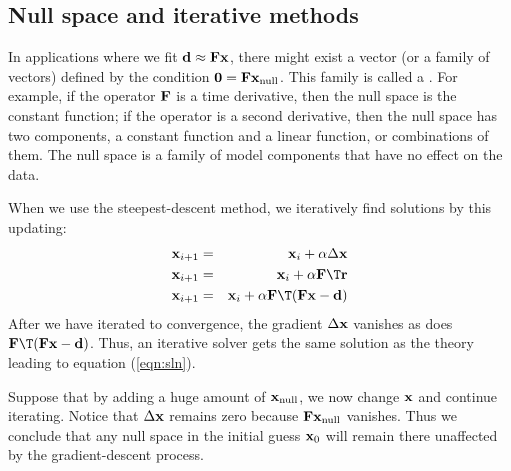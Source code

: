 \subsection{Null space and iterative methods}
In applications where we fit
$\bold d \approx\bold F \bold x$,
there might exist a vector (or a family of vectors)
defined by the condition $\bold 0 =\bold F \bold x_{\rm null}$.
This family is called a .
For example, if the operator $\bold F$ is a time derivative,
then the null space is the constant function;
if the operator is a second derivative,
then the null space has two components, a constant function
and a linear function, or combinations of them.
The null space is a family of model components that have no effect on the data.
\par
When we use the steepest-descent method,
we iteratively find solutions by this updating:
\begin{eqnarray}
\bold x_{i+1} &=& \bold x_i + \alpha \Delta \bold x                     \\
\bold x_{i+1} &=& \bold x_i + \alpha \bold F\T \bold r                   \\
\bold x_{i+1} &=& \bold x_i + \alpha \bold F\T(\bold F\bold x -\bold d)
\end{eqnarray}
After we have iterated to convergence,
the gradient $ \Delta \bold x$ vanishes
as does $\bold F\T(\bold F\bold x -\bold d)$.
Thus, an iterative solver gets the same solution
as the theory leading to equation (\ref{eqn:sln}).
\par
Suppose that by adding a huge amount of $\bold x_{\rm null}$,
we now change $\bold x$
and continue iterating.
Notice that $ \Delta \bold x$ remains zero
because $\bold F \bold x_{\rm null}$ vanishes.
Thus we conclude that any null space in the initial guess $\bold x_0$
will remain there unaffected by the gradient-descent process.

